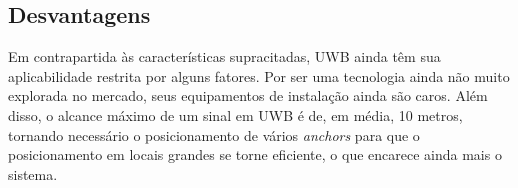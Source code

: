 \subsection{Desvantagens}
Em contrapartida às características supracitadas, UWB ainda têm sua aplicabilidade restrita por alguns fatores.
Por ser uma tecnologia ainda não muito explorada no mercado, seus equipamentos de instalação ainda são caros. Além disso,
o alcance máximo de um sinal em UWB é de, em média, 10 metros, tornando necessário o posicionamento de vários \textit{anchors} para que
o posicionamento em locais grandes se torne eficiente, o que encarece ainda mais o sistema.




